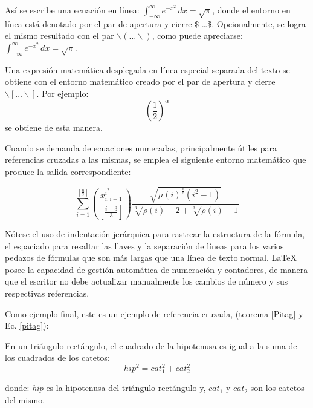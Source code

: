 Así se escribe una ecuación en línea: $\int_{-\infty}^{\infty} e^{-x^{2}} \, dx = \sqrt{\pi}$, donde el entorno en línea está denotado por el par de apertura y cierre \$ \dots \$. Opcionalmente, se logra el mismo resultado con el par $ \backslash( \dots \backslash) $, como puede apreciarse: \( \int_{-\infty}^{\infty} e^{-x^{2}} \, dx = \sqrt{\pi} \).

Una expresión matemática desplegada en línea especial separada del texto se obtiene con el entorno matemático creado por el par de apertura y cierre $ \backslash[ \dots \backslash] $. Por ejemplo: \[ \left( \frac{1}{2} \right)^{\alpha} \] se obtiene de esta manera.

Cuando se demanda de ecuaciones numeradas, principalmente útiles para referencias cruzadas a las mismas, se emplea el siguiente entorno matemático que produce la salida correspondiente:



\begin{equation}
\sum_{i = 1}^{ \left[ \frac{n}{2} \right] }
\binom{ x_{i, i + 1}^{i^{2}} }
{ \left[ \frac{i + 3}{3} \right] }
\frac{ \sqrt{ \mu(i)^{ \frac{3}{2}} (i^{2} - 1) } }
{\sqrt[3]{\rho(i)-2} + \sqrt[3]{\rho(i) - 1}}
\end{equation}

Nótese el uso de indentación jerárquica para rastrear la estructura de la fórmula, el espaciado para resaltar las llaves y la separación de líneas para los varios pedazos de fórmulas que son más largas que una línea de texto normal. LaTeX posee la capacidad de gestión automática de numeración y contadores, de manera que el escritor no debe actualizar manualmente los cambios de número y sus respectivas referencias.


Como ejemplo final, este es un ejemplo de referencia cruzada, (teorema \ref{Pitag} y Ec. \ref{pitag}):

\begin{teorema}
En un triángulo rectángulo, el cuadrado de la hipotenusa es igual a la suma de los cuadrados de los catetos:
\begin{equation}
hip^2 = cat_1^2 + cat_2^2
\label{pitag}
\end{equation}
\label{Pitag}
\end{teorema}
donde: \textit{hip} es la hipotenusa del triángulo rectángulo y, $ cat_1 $ y $ cat_2 $ son los catetos del mismo.
